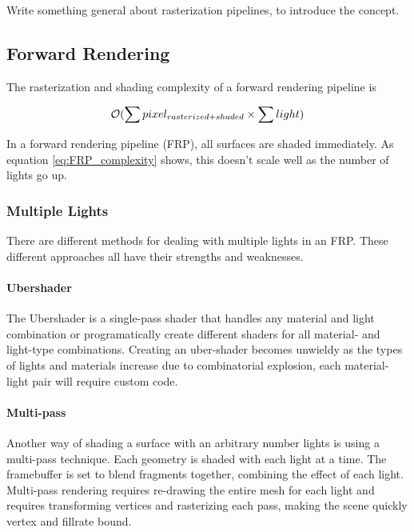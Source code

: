 Write something general about rasterization pipelines, to introduce the concept.


\subsection{Forward Rendering}

The rasterization and shading complexity of a forward rendering pipeline is

\begin{equation}\label{eq:FRP_complexity}
  \mathcal{O}(\sum {pixel_{rasterized + shaded}} \times \sum light)
\end{equation}

In a forward rendering pipeline (FRP), all surfaces are shaded immediately. As equation \eqref{eq:FRP_complexity} shows, this doesn't scale well as the number of lights go up.

\subsubsection{Multiple Lights}

There are different methods for dealing with multiple lights in an FRP. These different approaches all have their strengths and weaknesses.

\paragraph{Ubershader}

The Ubershader is a single-pass shader that handles any material and light combination or programatically create different shaders for all material- and light-type combinations. Creating an uber-shader becomes unwieldy as the types of lights and materials increase due to combinatorial explosion, each material-light pair will require custom code.

\paragraph{Multi-pass}

Another way of shading a surface with an arbitrary number lights is using a multi-pass technique. Each geometry is shaded with each light at a time. The framebuffer is set to blend fragments together, combining the effect of each light. Multi-pass rendering requires re-drawing the entire mesh for each light and requires transforming vertices and rasterizing each pass, making the scene quickly vertex and fillrate bound.

